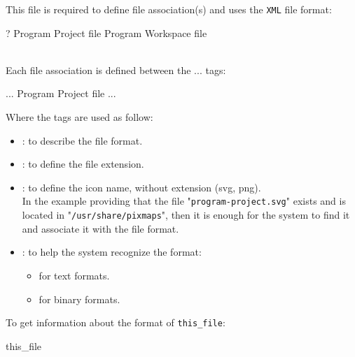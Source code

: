 This file is required to define file association(s) and uses the \texttt{XML} file format:
{\scriptsize{
\begin{script}
?  
 \dbtt{>}
   \dbtt{>}
    Program Project file
     \dbtt{/>}
     \dbtt{/>}
     \dbtt{/>}
   \dbtt{>}
    Program Workspace file
     \dbtt{/>}
     \dbtt{/>}
     \dbtt{/>}
\end{script}
}}
\\
\noindent Each file association is defined between the   ...  tags:
{\scriptsize{
\begin{script}
...
   \dbtt{>}
    Program Project file
     \dbtt{/>}
     \dbtt{/>}
     \dbtt{/>}
... 
\end{script}
}}
\noindent Where the tags are used as follow:
\begin{itemize}
\item {}: to describe the file format.
\item {}: to define the file extension.
\item {}: to define the icon name, without extension (svg, png). \\
In the example providing that the file "\texttt{program-project.svg}" exists and is located in "\texttt{/usr/share/pixmaps}", 
then it is enough for the system to find it and associate it with the file format.
\item {}: to help the system recognize the format:
\begin{itemize}
\item {} for text formats.
\item {} for binary formats.
\end{itemize}
\end{itemize}
\noindent To get information about the format of \texttt{this\_file}: 
\vspace{-0.25cm}
\begin{script}
\fprompt{~}   this\_file
\end{script}

